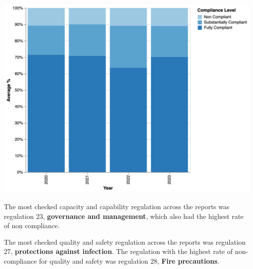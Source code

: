 \documentclass[a4paper,11pt,twoside]{article}
\begin{document}
\begin{center}
\includegraphics[width=.9\linewidth]{img/07_compliance_by_year.png}
\end{center}

The most checked capacity and capability regulation across the reports was regulation 23, \textbf{governance and management}, which also had the highest rate of non compliance.

The most checked quality and safety regulation across the reports was regulation 27, \textbf{protections against infection}. The regulation with the highest rate of non-compliance for quality and safety was regulation 28, \textbf{Fire precautions}.
\end{document}
